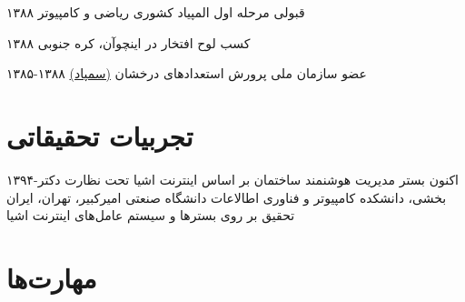 \documentclass[]{friggeri-cv-fa} %
\begin{document}
\begin{entrylist}
	\entry
	{۱۳۸۸}
	{{\normalfont قبولی} \textcolor{TextOrange}{مرحله اول} {\normalfont المپیاد کشوری ریاضی و کامپیوتر}}
	{}
	{}


	\entry
	{۱۳۸۸}
	{{\normalfont کسب} \textcolor{Ocean}{لوح افتخار} {\normalfont در 
	اینچوآن، کره جنوبی}}
	{}
	{}


	\entry
	{۱۳۸۵-۱۳۸۸}
	{\normalfont عضو سازمان ملی پرورش استعداد‌های درخشان \href{https://en.wikipedia.org/wiki/National_Organization_for_Development_of_Exceptional_Talents}{(سمپاد)}}
	{}
	{}


\end{entrylist}


\section{تجربیات تحقیقاتی}

\begin{entrylist}

	\entry
	{۱۳۹۴-اکنون}
	{بستر مدیریت هوشنمند ساختمان بر اساس اینترنت اشیا}
	{تحت نظارت دکتر بخشی، دانشکده کامپیوتر و فناوری اطالاعات دانشگاه صنعتی امیرکبیر، تهران، ایران}
	{تحقیق بر روی بسترها و سیستم عامل‌های اینترنت اشیا}

\end{entrylist}


\section{مهارت‌ها}
\end{document}

